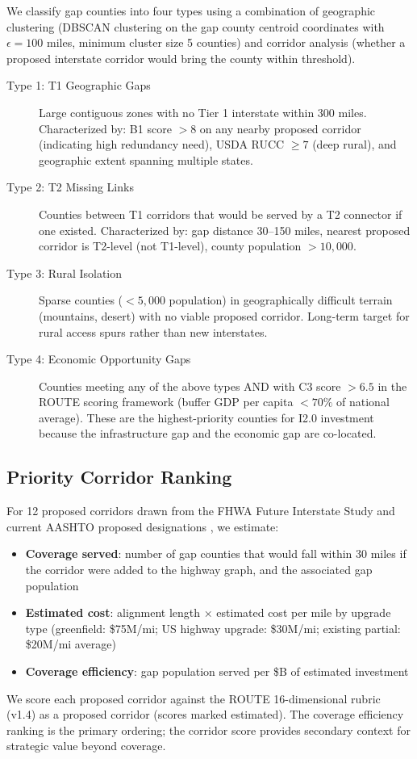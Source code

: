 We classify gap counties into four types using a combination of geographic clustering (DBSCAN clustering on the gap county centroid coordinates with $\epsilon = 100$ miles, minimum cluster size 5 counties) and corridor analysis (whether a proposed interstate corridor would bring the county within threshold).

\begin{description}
\item[Type 1: T1 Geographic Gaps] Large contiguous zones with no Tier 1 interstate within 300 miles. Characterized by: B1 score $> 8$ on any nearby proposed corridor (indicating high redundancy need), USDA RUCC $\geq 7$ (deep rural), and geographic extent spanning multiple states.
\item[Type 2: T2 Missing Links] Counties between T1 corridors that would be served by a T2 connector if one existed. Characterized by: gap distance 30--150 miles, nearest proposed corridor is T2-level (not T1-level), county population $> 10,000$.
\item[Type 3: Rural Isolation] Sparse counties ($< 5,000$ population) in geographically difficult terrain (mountains, desert) with no viable proposed corridor. Long-term target for rural access spurs rather than new interstates.
\item[Type 4: Economic Opportunity Gaps] Counties meeting any of the above types AND with C3 score $> 6.5$ in the ROUTE scoring framework (buffer GDP per capita $< 70\%$ of national average). These are the highest-priority counties for I2.0 investment because the infrastructure gap and the economic gap are co-located.
\end{description}

\subsection{Priority Corridor Ranking}

For 12 proposed corridors drawn from the FHWA Future Interstate Study \citep{FHWA_FIS2000} and current AASHTO proposed designations \citep{AASHTO2023}, we estimate:

\begin{itemize}
\item \textbf{Coverage served}: number of gap counties that would fall within 30 miles if the corridor were added to the highway graph, and the associated gap population
\item \textbf{Estimated cost}: alignment length × estimated cost per mile by upgrade type (greenfield: \$75M/mi; US highway upgrade: \$30M/mi; existing partial: \$20M/mi average)
\item \textbf{Coverage efficiency}: gap population served per \$B of estimated investment
\end{itemize}

We score each proposed corridor against the ROUTE 16-dimensional rubric (v1.4) as a proposed corridor (scores marked estimated). The coverage efficiency ranking is the primary ordering; the corridor score provides secondary context for strategic value beyond coverage.
